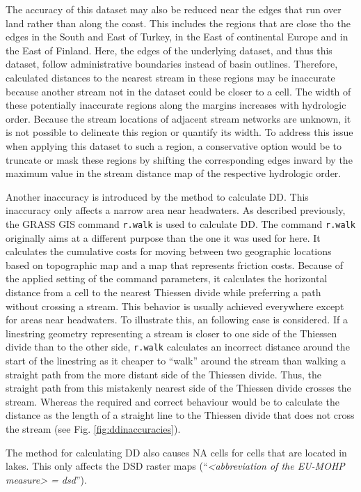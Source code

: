 \documentclass[fleqn,10pt]{wlscirep}
\begin{document}
The accuracy of this dataset may also be reduced near the edges that run over land rather than along the coast. This includes the regions that are close tho the edges in the South and East of Turkey, in the East of continental Europe and in the East of Finland. Here, the edges of the underlying dataset, and thus this dataset, follow administrative boundaries instead of basin outlines. Therefore, calculated distances to the nearest stream in these regions may be inaccurate because another stream not in the dataset could be closer to a cell. The width of these potentially inaccurate regions along the margins increases with hydrologic order. Because the stream locations of adjacent stream networks are unknown, it is not possible to delineate this region or quantify its width. To address this issue when applying this dataset to such a region, a conservative option would be to truncate or mask these regions by shifting the corresponding edges inward by the maximum value in the stream distance map of the respective hydrologic order.

Another inaccuracy is introduced by the method to calculate DD. This inaccuracy only affects a narrow area near headwaters. As described previously, the GRASS GIS command \texttt{r.walk} is used to calculate DD. The command \texttt{r.walk} originally aims at a different purpose than the one it was used for here. It calculates the cumulative costs for moving between two geographic locations based on topographic map and a map that represents friction costs. Because of the applied setting of the command parameters, it calculates the horizontal distance from a cell to the nearest Thiessen divide while preferring a path without crossing a stream. This behavior is usually achieved everywhere except for areas near headwaters. To illustrate this, an following case is considered. If a linestring geometry representing a stream is closer to one side of the Thiessen divide than to the other side, \texttt{r.walk} calculates an incorrect distance around the start of the linestring as it cheaper to ``walk'' around the stream than walking a straight path from the more distant side of the Thiessen divide. Thus, the straight path from this mistakenly nearest side of the Thiessen divide crosses the stream. Whereas the required and correct behaviour would be to calculate the distance as the length of a straight line to the Thiessen divide that does not cross the stream (see Fig. \ref{fig:ddinaccuracies}).

The method for calculating DD also causes NA cells for cells that are located in lakes. This only affects the DSD raster maps (``\emph{\textless abbreviation of the EU-MOHP measure\textgreater{} = dsd}'').
\end{document}

